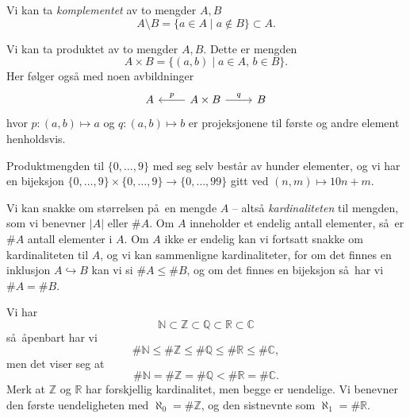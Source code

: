 \begin{definition}
    Vi kan ta \textit{komplementet} av to mengder $A, B$
    \[
        A\setminus B = \{ a\in A\mid a\notin B\} \subset A.
    \]
\end{definition}

\begin{example}
    Vi kan ta produktet av to mengder $A, B$.
    Dette er mengden
    \[
        A\times B = \{
            (a,b)\mid a\in A,\, b\in B
        \}.
    \]
    Her følger også med noen avbildninger
    \[\begin{tikzcd}
        A
        \rar[<-]{p}
        &
        A\times B
        \rar{q}
        &
        B
    \end{tikzcd}\]
    hvor $p\colon (a,b)\mapsto a$ og $q\colon (a,b)\mapsto b$ er
    projeksjonene til første og andre element henholdsvis.
\end{example}

\begin{example}
    Produktmengden til $\{0,\dots,9\}$ med seg selv består av hunder elementer,
    og vi har en bijeksjon $\{0,\dots,9\}\times\{0,\dots,9\}\to \{0,\dots,99\}$
    gitt ved $(n, m)\mapsto 10n + m$.
\end{example}

\begin{definition}
    Vi kan snakke om størrelsen på en mengde $A$ -- altså \textit{kardinaliteten}
    til mengden, som vi benevner $|A|$ eller $\# A$.
    Om $A$ inneholder et endelig antall elementer,
    så er $\# A$ antall elementer i $A$.
    Om $A$ ikke er endelig kan vi fortsatt snakke om kardinaliteten til $A$,
    og vi kan sammenligne kardinaliteter,
    for om det finnes en inklusjon $A\hookrightarrow B$
    kan vi si $\# A\leq \# B$,
    og om det finnes en bijeksjon så har vi $\# A = \# B$.
\end{definition}

\begin{example}
    Vi har
    \[
        \mathbb N
        \subset \mathbb Z
        \subset \mathbb Q
        \subset \mathbb R
        \subset \mathbb C
    \]
    så åpenbart har vi
    \[
        \#\mathbb N
        \leq \#\mathbb Z
        \leq \#\mathbb Q
        \leq \#\mathbb R
        \leq \#\mathbb C,
    \]
    men det viser seg at
    \[
        \#\mathbb N
        = \#\mathbb Z
        = \#\mathbb Q
        < \#\mathbb R
        = \#\mathbb C.
    \]
    Merk at $\mathbb Z$ og $\mathbb R$ har forskjellig kardinalitet,
    men begge er uendelige.
    Vi benevner den første uendeligheten med $\aleph_0 = \#\mathbb Z$,
    og den sistnevnte som $\aleph_1 = \#\mathbb R$.
\end{example}

